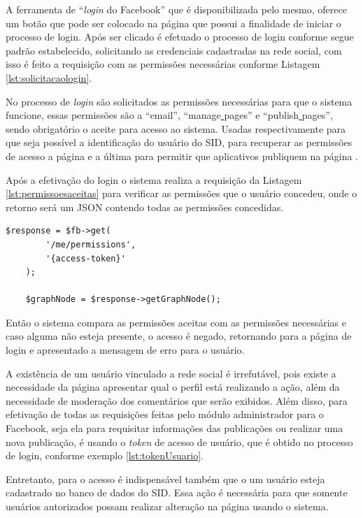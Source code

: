 A ferramenta de ``\textit{login} do Facebook'' que é disponibilizada pelo mesmo, oferece um botão que pode ser colocado na página que possui a finalidade de iniciar o processo de login. Após ser clicado é efetuado o processo de login conforme segue padrão estabelecido, solicitando as credenciais cadastradas na rede social, com isso é feito a requisição com as permissões necessárias conforme Listagem \ref{lst:solicitacaologin}.

No processo de \textit{login} são solicitados as permissões necessárias para que o sistema funcione, essas permissões são a “email”, “manage\underline{{ }}pages” e “publish\underline{{ }}pages”, sendo obrigatório o aceite para acesso ao sistema. Usadas respectivamente para que seja possível a identificação do usuário do SID, para recuperar as permissões de acesso a página e a última para permitir que aplicativos publiquem na página \cite{facebook2018a}.

Após a efetivação do login o sistema realiza a requisição da Listagem \ref{lst:permissoesaceitas} para verificar as permissões que o usuário concedeu, onde o retorno será um JSON contendo todas as permissões concedidas.

\begin{lstlisting}[caption={Permissões concedidas},label={lst:permissoesaceitas}]
  	$response = $fb->get(
    	'/me/permissions',
		'{access-token}'
	);
	
	$graphNode = $response->getGraphNode();
\end{lstlisting}

Então o sistema compara as permissões aceitas com as permissões necessárias e caso alguma não esteja presente, o acesso é negado, retornando para a página de login e apresentado a mensagem de erro para o usuário.

A existência de um usuário vinculado a rede social é irrefutável, pois existe a necessidade da página apresentar qual o perfil está realizando a ação, além da necessidade de moderação dos comentários que serão exibidos.  Além disso, para efetivação de todas as requisições feitas pelo módulo administrador para o Facebook, seja ela para requisitar informações das publicações ou realizar uma nova publicação, é usando o \textit{token} de acesso de usuário, que é obtido no processo de login, conforme exemplo \ref{lst:tokenUsuario}.

Entretanto, para o acesso é indispensável também que o um usuário esteja cadastrado no banco de dados do SID. Essa ação é necessária para que somente usuários autorizados possam realizar alteração na página usando o sistema.

